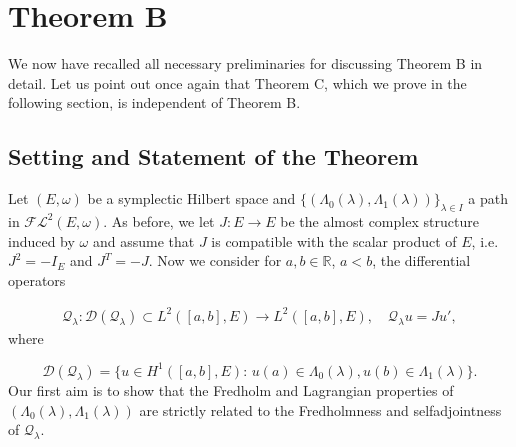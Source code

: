 \documentclass[a4paper,10pt]{article}
\begin{document}








\section{Theorem B}
We now have recalled all necessary preliminaries for discussing Theorem B in detail. Let us point out once again that Theorem C, which we prove in the following section, is independent of Theorem B.

\subsection{Setting and Statement of the Theorem}
Let $(E,\omega)$ be a symplectic Hilbert space and $\{(\Lambda_0(\lambda),\Lambda_1(\lambda))\}_{\lambda\in I}$ a path in $\mathcal{FL}^2(E,\omega)$. As before, we let $J:E\rightarrow E$ be the almost complex structure induced by $\omega$ and assume that $J$ is compatible with the scalar product of $E$, i.e. $J^2=-I_E$ and $J^T=-J$. Now we consider for $a,b\in\mathbb{R}$, $a<b$, the differential operators

\begin{align}\label{Q}
\mathcal{Q}_\lambda:\mathcal{D}(\mathcal{Q}_\lambda)\subset L^2([a,b],E)\rightarrow L^2([a,b],E),\quad \mathcal{Q}_\lambda u=Ju',
\end{align}
where

\[\mathcal{D}(\mathcal{Q}_\lambda)=\{u\in H^1([a,b],E):\, u(a)\in\Lambda_0(\lambda), u(b)\in\Lambda_1(\lambda)\}.\]
Our first aim is to show that the Fredholm and Lagrangian properties of $(\Lambda_0(\lambda),\Lambda_1(\lambda))$ are strictly related to the Fredholmness and selfadjointness of $\mathcal{Q}_\lambda$.
\end{document}
